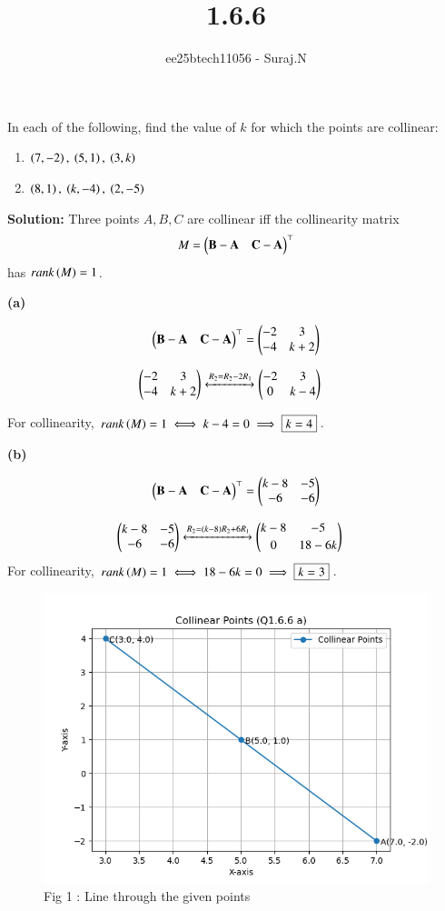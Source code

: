 \documentclass[journal,12pt,onecolumn]{IEEEtran}
\theoremstyle{remark}
\begin{document}
\title{1.6.6}
\author{ee25btech11056 - Suraj.N}
\maketitle
\renewcommand{\thefigure}{\theenumi}
\renewcommand{\thetable}{\theenumi}

In each of the following, find the value of $k$ for which the points are collinear:
\begin{enumerate}
\item $\brak{7,-2},\ \brak{5,1},\ \brak{3,k}$
\item $\brak{8,1},\ \brak{k,-4},\ \brak{2,-5}$
\end{enumerate}

\textbf{Solution:} Three points $A, B, C$ are collinear iff the collinearity matrix
\begin{align*}
M=\myvec{ \vec{B}-\vec{A} & \vec{C}-\vec{A} }^\top
\end{align*}
has $rank\brak{M}=1$.

\textbf{(a)} 

\begin{align*}
\myvec{ \vec{B}-\vec{A} & \vec{C}-\vec{A} }^\top = \myvec{-2 & 3\\ -4 & k+2}
\end{align*}

\begin{align*}
\myvec{-2 & 3\\ -4 & k+2}
&\xleftrightarrow{R_2 = R_2 - 2R_1}
\myvec{-2 & 3\\ 0 & k-4}
\end{align*}

For collinearity, $rank\brak{M}=1 \iff k-4=0 \implies \boxed{k=4}$.

\textbf{(b)} 

\begin{align*}
\myvec{ \vec{B}-\vec{A} & \vec{C}-\vec{A} }^\top = \myvec{k-8 & -5\\ -6 & -6}
\end{align*}

\begin{align*}
\myvec{k-8 & -5\\ -6 & -6}
&\xleftrightarrow{R_2 = (k-8)R_2 + 6R_1}
\myvec{k-8 & -5\\[2pt] 0 & 18-6k}
\end{align*}
For collinearity, $rank\brak{M}=1 \iff 18-6k=0 \implies \boxed{k=3}$.

\pagebreak

\begin{figure}[h!]
  \centering
  \includegraphics[width=0.5\columnwidth]{figs/fig_a.png} 
   \caption*{Fig 1 : Line through the given points}
  \label{Fig1}
\end{figure}
\end{document}
